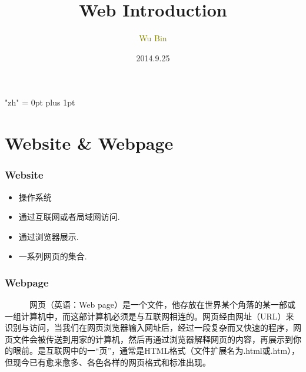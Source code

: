 \documentclass[notheorems,mathserif,table,compress]{beamer}  %
\begin{document}
\XeTeXlinebreaklocale "zh"         %
\XeTeXlinebreakskip = 0pt plus 1pt %
\begin{comment}
\AtBeginSection[]{                              %
  \frame<handout:0>{
    \frametitle{Content}\small
    \tableofcontents[current,currentsubsection]
  }
}
\AtBeginSubsection[]                            %
{
  \frame<handout:0>                             %
  {
    \frametitle{下一节内容}\small
    \tableofcontents[current,currentsubsection] %
  }
}
\end{comment}
\title[Web Introduction]{Web Introduction}
\author[WU Bin]{\textcolor{olive}{Wu Bin}}
\date{2014.9.25}
\frame{ \titlepage }

\section{Website \& Webpage}
\begin{frame}
 \frametitle{Website}
 	 \begin{itemize}
	 \item 操作系统
	 \item 通过互联网或者局域网访问. 
	 \item 通过浏览器展示.
	 \item 一系列网页的集合.
	 \end{itemize}
\end{frame}
\begin{frame}
 \frametitle{Webpage}
~~~~~~网页（英语：Web page）是一个文件，他存放在世界某个角落的某一部或一组计算机中，而这部计算机必须是与互联网相连的。网页经由网址（URL）来识别与访问，当我们在网页浏览器输入网址后，经过一段复杂而又快速的程序，网页文件会被传送到用家的计算机，然后再通过浏览器解释网页的内容，再展示到你的眼前。是互联网中的一“页”，通常是HTML格式（文件扩展名为.html或.htm），但现今已有愈来愈多、各色各样的网页格式和标准出现。
\end{frame}
\end{document}
